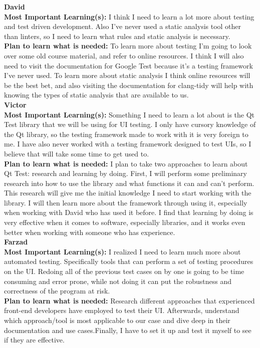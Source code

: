 \documentclass[12pt, titlepage]{article}
\begin{document}
\noindent\textbf{David}\\
\textbf{Most Important Learning(s):} I think I need to learn a lot more about testing and test driven development.
Also I've never used a static analysis tool other than linters, so I need to learn what rules and static analysis
is necessary.\\
\textbf{Plan to learn what is needed:} To learn more about testing I'm going to look over some old course material,
and refer to online resources. I think I will also need to visit the documentation for Google Test because it's
a testing framework I've never used. To learn more about static analysis I think online resources will be the best
bet, and also visiting the documentation for clang-tidy will help with knowing the types of static analysis that
are available to us.\\

\noindent\textbf{Victor}\\
\textbf{Most Important Learning(s):} Something I need to learn a lot about is the Qt Test library that we will be using for UI testing. I only have cursory knowledge of the Qt library, so the testing framework made to work with it is very foreign to me. I have also never worked with a testing framework designed to test UIs, so I believe that will take some time to get used to.\\
\textbf{Plan to learn what is needed:} I plan to take two approaches to learn about Qt Test: research and learning by doing. First, I will perform some preliminary research into how to use the library and what functions it can and can't perform. This research will give me the initial knowledge I need to start working with the library. I will then learn more about the framework through using it, especially when working with David who has used it before. I find that learning by doing is very effective when it comes to software, especially libraries, and it works even better when working with someone who has experience.\\

\noindent\textbf{Farzad}\\
\textbf{Most Important Learning(s):} I realized I need to learn much more about automated testing. Specifically tools that can perform a set of testing procedures on the UI. Redoing all of the previous test cases on by one is going to be time consuming and error prone, while not doing it can put the robustness and correctness of the program at risk. \\
\textbf{Plan to learn what is needed:} Research different approaches that experienced front-end developers have employed to test their UI. Afterwards, understand which approach/tool is most applicable to our case and dive deep in their documentation and use cases.Finally, I have to set it up and test it myself to see if they are effective.\\
\end{document}
